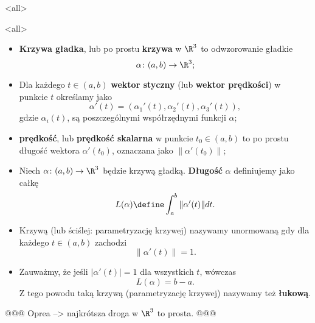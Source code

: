 \mode*
\mode<all>{}

\begin{frame}[<+->]
\begin{center}
\begin{tikzpicture}[y=0.80pt, x=0.8pt,scale=0.7,yscale=-1, inner sep=0pt, outer sep=0pt]

\end{tikzpicture}
\end{center}
\end{frame}
\mode<all>{}
\begin{frame}[<+->]
\begin{definicja}
\begin{itemize}
\item\textbf{Krzywa gładka}, lub po prostu \textbf{krzywa} w $\R^3$ to odwzorowanie gładkie \[\alpha\colon (a,b)\to \R^3;\]
\item Dla każdego $t\in (a,b)$ \textbf{wektor styczny} (lub \textbf{wektor prędkości}) w punkcie $t$ określamy jako \[\alpha'(t)=(\alpha_1'(t),\alpha_2'(t),\alpha_3'(t)),\]gdzie $\alpha_i(t)$, są poszczególnymi współrzędnymi funkcji $\alpha$;
\item \textbf{prędkość}, lub \textbf{prędkość skalarna} w punkcie $t_0\in (a,b)$ to po prostu długość wektora $\alpha'(t_0)$, oznaczana jako $\|\alpha'(t_0)\|$;
\end{itemize}
\end{definicja}
\end{frame}
\begin{frame}[<+->]

\begin{definicja}
\begin{itemize}
\item Niech $\alpha\colon (a,b)\to \R^3$ będzie krzywą gładką. \textbf{Długość} $\alpha$ definiujemy jako całkę
\[L(\alpha)\define\int_a^b\|\alpha'(t)\|dt.\]
\item Krzywą (lub ściślej: parametryzację krzywej) nazywamy unormowaną gdy dla każdego $t\in (a,b)$ zachodzi \[\|\alpha'(t)\|=1.\]
\item Zauważmy, że jeśli $|\alpha'(t)|=1$ dla wszystkich $t$, w\'owczas 
\[L(\alpha)=b-a.\]Z tego powodu taką krzywą (parametryzację krzywej) nazywamy też \textbf{łukową}.
\end{itemize}

\end{definicja}
@@@ Oprea --> najkr\'otsza droga w $\R^3$ to prosta. @@@
\end{frame}

